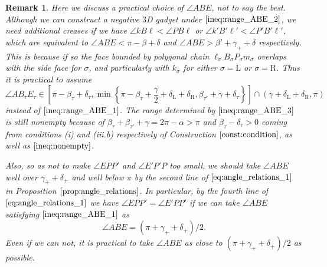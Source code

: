 \documentclass[11pt]{amsart}
\newtheorem{remark}[theorem]{Remark}
\numberwithin{equation}{section}
\numberwithin{theorem}{section}
\newcommand{\Lt}{\ensuremath{\mathrm{L}}}
\newcommand{\Rt}{\ensuremath{\mathrm{R}}}
\begin{document}
\begin{remark}\label{rem:ABE_practical}\rm
Here we discuss a practical choice of $\angle ABE$, not to say the best.
Although we can construct a negative $3$D gadget under $\eqref{ineq:range_ABE_2}$,
we need additional creases if we have $\angle kB\ell <\angle PB\ell$ or $\angle k'B'\ell'<\angle P'B'\ell'$,
which are equivalent to $\angle ABE<\pi -\beta +\delta$ and $\angle ABE>\beta'+\gamma_++\delta$ respectively.
This is because if so the face bounded by polygonal chain $\ell_\sigma B_\sigma P_\sigma m_\sigma$ overlaps
with the side face for $\sigma$, and particularly with $k_\sigma$ for either $\sigma =\Lt$ or $\sigma =\Rt$.
Thus it is practical to assume
\begin{equation}\label{ineq:range_ABE_3}
\angle AB_\tau E_\tau\in\left[\pi -\beta_\tau +\delta_\tau ,
\min\left\{\pi -\beta_\tau +\frac{\gamma}{2}+\delta_\Lt +\delta_\Rt ,\beta_{\tau'}+\gamma +\delta_\tau\right\}\right]
\cap (\gamma +\delta_\Lt +\delta_\Rt ,\pi )
\end{equation}
instead of $\eqref{ineq:range_ABE_1}$.
The range determined by $\eqref{ineq:range_ABE_3}$ is still nonempty
because of $\beta_\tau +\beta_{\tau'}+\gamma =2\pi -\alpha >\pi$ and $\beta_\tau -\delta_\tau >0$
coming from conditions (i) and (iii.b) respectively of Construction $\ref{const:condition}$, as well as $\eqref{ineq:nonempty}$.

Also, so as not to make $\angle EPP'$ and $\angle E'P'P$ too small, we should take $\angle ABE$ well over $\gamma_++\delta_+$ and well below $\pi$
by the second line of $\eqref{eq:angle_relations_1}$ in Proposition $\ref{prop:angle_relations}$.
In particular, by the fourth line of $\eqref{eq:angle_relations_1}$ 
we have $\angle EPP'=\angle E'PP'$ if we can take $\angle ABE$ satisfying $\eqref{ineq:range_ABE_1}$ as
\begin{equation*}
\angle ABE=(\pi +\gamma_++\delta_+)/2.
\end{equation*}
Even if we can not, it is practical to take $\angle ABE$ as close to $(\pi +\gamma_++\delta_+)/2$ as possible.
\end{remark}
\end{document}
